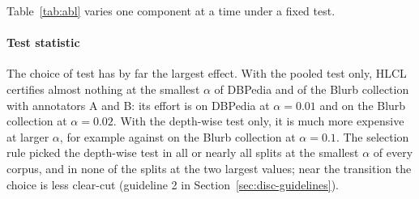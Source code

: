 \documentclass[preprint,12pt]{elsarticle}
\theoremstyle{definition}
\newcommand{\hlcl}{\textup{\textsc{HLCL}}}
\begin{document}
Table~\ref{tab:abl} varies one component at a time under a fixed test.

\paragraph{Test statistic}
The choice of test has by far the largest effect. With the pooled test only,
\hlcl{} certifies almost nothing at the smallest $\alpha$ of DBPedia and of the
Blurb collection with annotators A and B: its effort is
 on DBPedia at $\alpha=0.01$ and
 on the Blurb collection at $\alpha=0.02$. With
the depth-wise test only, it is much more expensive at larger $\alpha$, for
example  against
 on the Blurb collection at $\alpha=0.1$. The
selection rule picked the depth-wise test in all or nearly all splits at the
smallest $\alpha$ of every corpus, and in none of the splits at the two largest
values; near the transition the choice is less clear-cut (guideline 2 in
Section~\ref{sec:disc-guidelines}).
\end{document}
